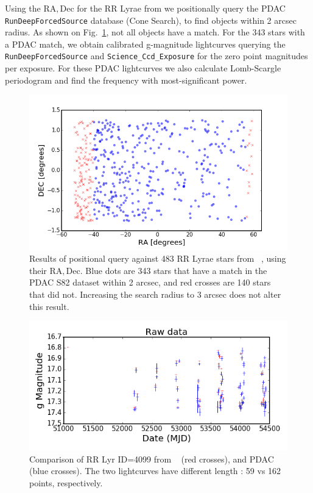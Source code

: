\documentclass[DM,lsstdraft,toc,usenatbib]{lsstdoc}
\begin{document}
Using the $\mathrm{RA}, \mathrm{Dec}$ for the RR Lyrae  from \cite{sesar2010} we positionally query the PDAC  \verb|RunDeepForcedSource| database (Cone Search), to find objects within 2 arcsec radius. As shown on Fig.~\ref{fig:PDAC_query_ra_dec}, not all objects have a match.  For the 343 stars with a PDAC match, we obtain calibrated g-magnitude lightcurves querying the \verb|RunDeepForcedSource| and \verb|Science_Ccd_Exposure| for the zero point magnitudes per exposure. For these PDAC lightcurves we also calculate Lomb-Scargle periodogram and find the frequency with most-significant power. %


\begin{figure}
\includegraphics[width=\columnwidth]{figs/missing_and_recovered_RR_Lyr_PDAC}
\caption{Results of positional query against 483 RR Lyrae stars from ~\citep{sesar2010}, using their $\mathrm{RA}, \mathrm{Dec}$. Blue dots are 343 stars that have a match in the PDAC S82 dataset within 2 arcsec, and red crosses are 140 stars that did not. Increasing the search radius to 3 arcsec does not alter this result. }
\label{fig:PDAC_query_ra_dec}
\end{figure}

\begin{figure}
\includegraphics[width=\columnwidth]{figs/Sesar_vs_PDAC_lc_4099}
\caption{Comparison of RR Lyr ID=4099  from  ~\citep{sesar2010}  (red crosses), and PDAC (blue crosses).  The two lightcurves have different length : 59 vs 162 points, respectively.}
\label{fig:PDAC_SDSS_compare_LC}
\end{figure}
\end{document}

